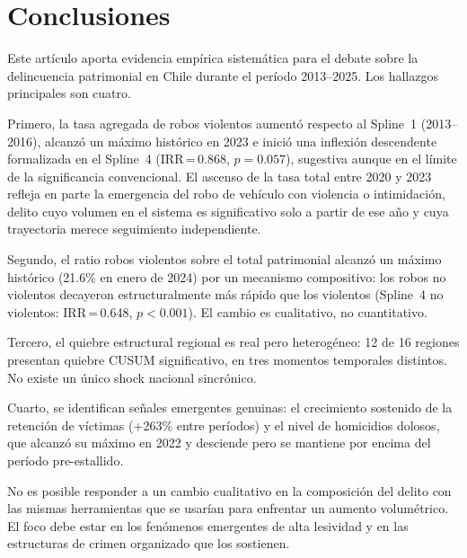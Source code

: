 \documentclass[12pt,a4paper]{article}
\begin{document}
\section{Conclusiones}
\label{sec:conclusiones}

Este art\'iculo aporta evidencia emp\'irica sistem\'atica para el debate sobre la
delincuencia patrimonial en Chile durante el per\'iodo 2013--2025. Los hallazgos
principales son cuatro.

Primero, la tasa agregada de robos violentos aument\'o respecto al Spline~1
(2013--2016), alcanz\'o un m\'aximo hist\'orico en 2023 e inici\'o una inflexi\'on
descendente formalizada en el Spline~4 (IRR\,=\,0.868, $p=0.057$), sugestiva aunque
en el l\'imite de la significancia convencional. El ascenso de la tasa total entre 2020 y 2023 refleja en parte la
emergencia del robo de veh\'iculo con violencia o intimidaci\'on, delito cuyo volumen
en el sistema es significativo solo a partir de ese a\~no y cuya trayectoria merece
seguimiento independiente.

Segundo, el ratio robos violentos sobre el total patrimonial alcanz\'o un m\'aximo
hist\'orico (21.6\% en enero de 2024) por un mecanismo compositivo: los robos no
violentos decayeron estructuralmente m\'as r\'apido que los violentos (Spline~4 no
violentos: IRR\,=\,0.648, $p<0.001$). El cambio es cualitativo, no cuantitativo.

Tercero, el quiebre estructural regional es real pero heterog\'eneo: 12 de 16 regiones
presentan quiebre CUSUM significativo, en tres momentos temporales distintos. No existe
un \'unico shock nacional sincr\'onico.

Cuarto, se identifican se\~nales emergentes genuinas: el crecimiento sostenido de
la retenci\'on de v\'ictimas (+263\% entre per\'iodos) y el nivel de homicidios
dolosos, que alcanz\'o su m\'aximo en 2022 y desciende pero se mantiene por encima del
per\'iodo pre-estallido.

No es posible responder a un cambio cualitativo en la composici\'on del delito con las
mismas herramientas que se usar\'ian para enfrentar un aumento volum\'etrico. El foco
debe estar en los fen\'omenos emergentes de alta lesividad y en las estructuras de
crimen organizado que los sostienen.


\newpage


\end{document}
